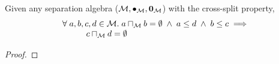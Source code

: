 %
%
%
\begin{lemma}[]\label{lem:noMeetByOrder}
Given any separation algebra ($\mathcal{M}, \bullet_{\mathcal{M}}, \mathbf{0}_{\mathcal{M}}$) with the cross-split property,
\[
\begin{array}{l}
	\forall\; a, b, c, d \in \mathcal{M}.\; a \sqcap_{\mathcal{M}} b = \emptyset \;\land\; a \leq d \;\land\; b \leq c \implies \\
	\hspace*{1cm} c \sqcap_{\mathcal{M}} d = \emptyset
\end{array}
\]
%
\begin{proof}
\todo
\end{proof}
\end{lemma}
%
%


